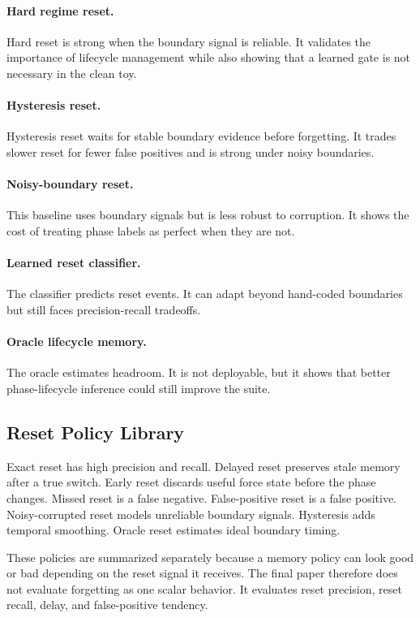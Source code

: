 \documentclass{article}
\begin{document}
\paragraph{Hard regime reset.}
Hard reset is strong when the boundary signal is reliable. It validates the
importance of lifecycle management while also showing that a learned gate is not
necessary in the clean toy.

\paragraph{Hysteresis reset.}
Hysteresis reset waits for stable boundary evidence before forgetting. It trades
slower reset for fewer false positives and is strong under noisy boundaries.

\paragraph{Noisy-boundary reset.}
This baseline uses boundary signals but is less robust to corruption. It shows
the cost of treating phase labels as perfect when they are not.

\paragraph{Learned reset classifier.}
The classifier predicts reset events. It can adapt beyond hand-coded boundaries
but still faces precision-recall tradeoffs.

\paragraph{Oracle lifecycle memory.}
The oracle estimates headroom. It is not deployable, but it shows that better
phase-lifecycle inference could still improve the suite.

\subsection{Reset Policy Library}

Exact reset has high precision and recall. Delayed reset preserves stale memory
after a true switch. Early reset discards useful force state before the phase
changes. Missed reset is a false negative. False-positive reset is a false
positive. Noisy-corrupted reset models unreliable boundary signals. Hysteresis
adds temporal smoothing. Oracle reset estimates ideal boundary timing.

These policies are summarized separately because a memory policy can look good
or bad depending on the reset signal it receives. The final paper therefore
does not evaluate forgetting as one scalar behavior. It evaluates reset
precision, reset recall, delay, and false-positive tendency.
\end{document}
